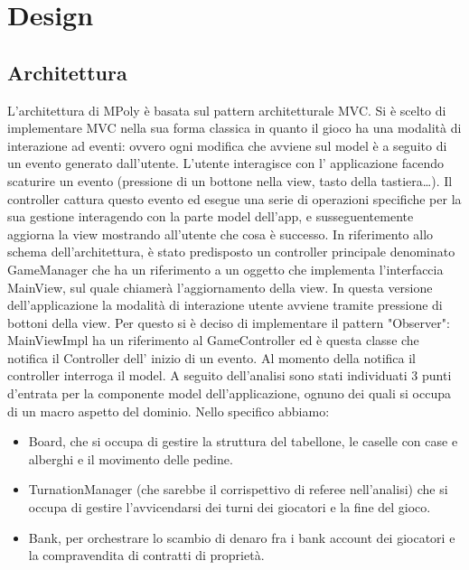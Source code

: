 \chapter{Design}

\section{Architettura}
L’architettura di MPoly è basata sul pattern architetturale MVC.\newline
Si è scelto di implementare MVC nella sua forma classica in quanto il gioco 
ha una modalità di interazione ad eventi: ovvero ogni modifica che avviene sul model è a seguito di un evento generato
dall'utente.\newline
L’utente interagisce con l' applicazione facendo scaturire un evento (pressione di un bottone nella view, tasto della tastiera\dots).
Il controller cattura questo evento ed esegue una serie di operazioni 
specifiche per la sua gestione interagendo con la parte model dell'app, e susseguentemente aggiorna la view 
mostrando all’utente che cosa è successo.\newline   
In riferimento allo schema dell'architettura, è stato predisposto un controller principale denominato GameManager 
che ha un riferimento a un oggetto che implementa l'interfaccia MainView,
sul quale chiamerà l'aggiornamento della view.\newline
In questa versione dell'applicazione la modalità di interazione utente avviene tramite pressione di bottoni della view.
Per questo si è deciso di implementare il pattern "Observer": MainViewImpl ha un riferimento al GameController ed è questa classe 
che notifica il Controller dell' inizio di un evento.
Al momento della notifica il controller interroga il model.\newline
A seguito dell'analisi sono stati individuati 3 punti d'entrata per la componente model dell'applicazione,
ognuno dei quali si occupa di un macro aspetto del dominio. 
Nello specifico abbiamo:
\begin{itemize}
    \item Board, che si occupa di gestire la struttura del tabellone, le caselle con case e alberghi e il movimento delle 
    pedine.
    \item TurnationManager (che sarebbe il corrispettivo di referee nell'analisi)
    che si occupa di gestire l'avvicendarsi dei turni dei giocatori e la fine del gioco.
    \item Bank, per orchestrare lo scambio di denaro fra i bank account dei giocatori e 
    la compravendita di contratti di proprietà.
\end{itemize} 
